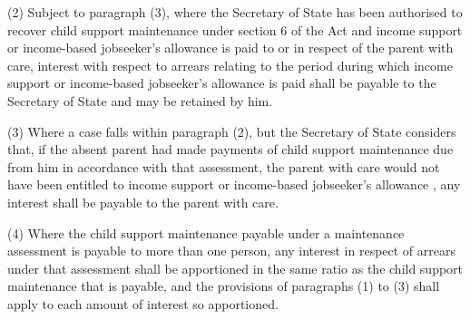 \documentclass[12pt,a4paper]{article}
\begin{document}
(2) Subject to paragraph (3), where the Secretary of State has been authorised to recover child support maintenance under section 6 of the Act and income support
or income-based jobseeker’s allowance  %
is paid to or in respect of the parent with care, interest with respect to arrears relating to the period during which income support 
or income-based jobseeker’s allowance  %
is paid shall be payable to the Secretary of State and may be retained by him.

(3) Where a case falls within paragraph (2), but the Secretary of State considers that, if the absent parent had made payments of child support maintenance due from him in accordance with that assessment, the parent with care would not have been entitled to income support
or income-based jobseeker’s allowance%
, any interest shall be payable to the parent with care.

(4) Where the child support maintenance payable under a maintenance assessment is payable to more than one person, any interest in respect of arrears under that assessment shall be apportioned in the same ratio as the child support maintenance that is payable, and the provisions of paragraphs (1) to (3) shall apply to each amount of interest so apportioned.


%

\end{document}
